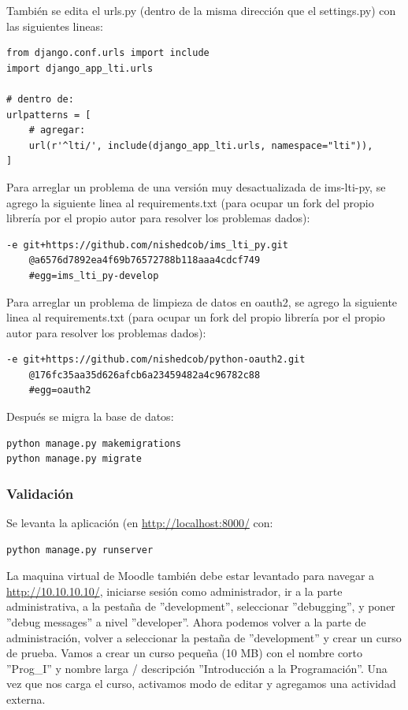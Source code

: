 También se edita el urls.py (dentro de la misma dirección que el settings.py) con las siguientes lineas:
\begin{lstlisting}
from django.conf.urls import include
import django_app_lti.urls

# dentro de:
urlpatterns = [
    # agregar:
    url(r'^lti/', include(django_app_lti.urls, namespace="lti")),
]

\end{lstlisting}

\lstset{language=Bash}

Para arreglar un problema de una versión muy desactualizada de ims-lti-py, se agrego la siguiente linea al requirements.txt (para ocupar un fork del propio librería por el propio autor para resolver los problemas dados):
\begin{lstlisting}
-e git+https://github.com/nishedcob/ims_lti_py.git
    @a6576d7892ea4f69b76572788b118aaa4cdcf749
    #egg=ims_lti_py-develop
\end{lstlisting}

Para arreglar un problema de limpieza de datos en oauth2, se agrego la siguiente linea al requirements.txt (para ocupar un fork del propio librería por el propio autor para resolver los problemas dados):
\begin{lstlisting}
-e git+https://github.com/nishedcob/python-oauth2.git
    @176fc35aa35d626afcb6a23459482a4c96782c88
    #egg=oauth2
\end{lstlisting}

Después se migra la base de datos:
\begin{lstlisting}
python manage.py makemigrations
python manage.py migrate
\end{lstlisting}

\subsubsection{Validación}

Se levanta la aplicación (en \url{http://localhost:8000/} con:
\begin{lstlisting}
python manage.py runserver
\end{lstlisting}
La maquina virtual de Moodle también debe estar levantado para navegar a \url{http://10.10.10.10/}, iniciarse sesión como administrador, ir a la parte administrativa, a la pestaña de ''development'', seleccionar ''debugging'', y poner ''debug messages'' a nivel ''developer''. Ahora podemos volver a la parte de administración, volver a seleccionar la pestaña de ''development'' y crear un curso de prueba. Vamos a crear un curso pequeña (10 MB) con el nombre corto ''Prog\_I'' y nombre larga / descripción ''Introducción a la Programación''. Una vez que nos carga el curso, activamos modo de editar y agregamos una actividad externa.

